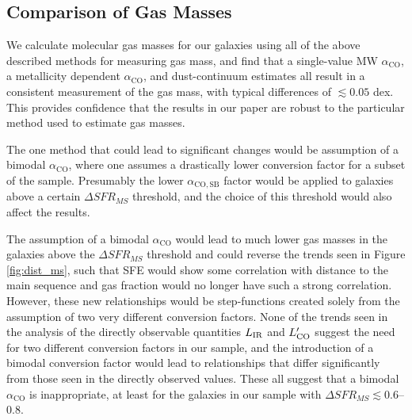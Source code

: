 \documentclass[a4paper,fleqn,usenatbib]{mnras}
\newcommand{\lir}{L_{\rm{IR}}}
\newcommand{\lco}{L'_{\rm{CO}}}
\newcommand{\aco}{\alpha_{\mathrm{CO}}}
\begin{document}
\subsection{Comparison of Gas Masses}\label{sec:gas_mass_comp}

We calculate molecular gas masses for our galaxies using all of the above described methods for measuring gas mass, and find that a single-value MW $\aco$, a metallicity dependent $\aco$, and dust-continuum estimates all result in a consistent measurement of the gas mass, with typical differences of $\lesssim 0.05$ dex. This provides confidence that the results in our paper are robust to the particular method used to estimate gas masses. 

The one method that could lead to significant changes would be assumption of a bimodal $\aco$, where one assumes a drastically lower conversion factor for a subset of the sample. Presumably the lower $\alpha_{\mathrm{CO,SB}}$ factor would be applied to galaxies above a certain $\Delta SFR_{MS}$ threshold, and the choice of this threshold would also affect the results.  

The assumption of a bimodal $\aco$ would lead to much lower gas masses in the galaxies above the $\Delta SFR_{MS}$ threshold and could reverse the trends seen in Figure \ref{fig:dist_ms}, such that SFE would show some correlation with distance to the main sequence and gas fraction would no longer have such a strong correlation.  However, these new relationships would be step-functions created solely from the assumption of two very different conversion factors. None of the trends seen in the analysis of the directly observable quantities $\lir$ and $\lco$ suggest the need for two different conversion factors in our sample, and the introduction of a bimodal conversion factor would lead to relationships that differ significantly from those seen in the directly observed values. These all suggest that a bimodal $\aco$ is inappropriate, at least for the galaxies in our sample with $\Delta SFR_{MS} \lesssim 0.6$--0.8. 
\end{document}
